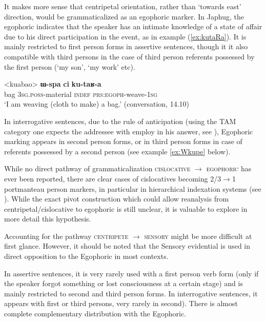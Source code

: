 \documentclass[oldfontcommands,oneside,a4paper,11pt]{article}
\newcommand{\ipa}[1]{\mbox{\phon\textbf{#1}}} %
\begin{document}
It makes more sense that centripetal orientation, rather than `towards east' direction, would be grammaticalized as an egophoric marker. In Japhug, the egophoric indicates that the speaker has an  intimate knowledge of a state of affair due to his direct participation in the event, as in example (\ref{ex:kutaRa}). It is mainly restricted to first person forms in assertive sentences, though it it also compatible with third persons in the case of third person referents possessed by the first person (`my son', `my work' etc). 

\begin{exe}
\ex \label{ex:kutaRa}
\gll 
<kuabao> 	\ipa{ɯ-spa}  	\ipa{ci}  	\ipa{ku-taʁ-a}  \\
bag \textsc{3sg.poss}-material \textsc{indef} \textsc{prs:egoph}-weave-\textsc{1sg} \\
\glt `I am weaving (cloth to make) a bag.' (conversation, 14.10)
\end{exe}

In interrogative sentences, due to the rule of anticipation (using the TAM category one expects the addressee with employ in his answer, see \citealt{tournadre14evidentiality}), Egophoric marking appears in second person forms, or in third person forms in case of referents possessed by a second person (see example \ref{ex:Wkupe} below).

While no direct pathway of grammaticalization \textsc{cislocative} $\rightarrow$ \textsc{egophoric} has ever been reported, there are clear cases of cislocatives becoming 2/3$\rightarrow$1 portmanteau person markers, in particular in hierarchical indexation systems (see \citealt{jacques14inverse}). While the exact pivot construction which could allow reanalysis from centripetal/cislocative to egophoric is still unclear, it is valuable to explore in more detail this hypothesis.

Accounting for the pathway \textsc{centripete} $\rightarrow$ \textsc{sensory} might be more difficult at first glance. However, it should be noted that the Sensory evidential is used in direct opposition to the Egophoric in most contexts. 

In assertive sentences, it is very rarely used with a first person verb form (only if the speaker forgot something or lost consciousness at a certain stage) and is mainly restricted to second and third person forms. In interrogative sentences, it appears with first or third persons, very rarely in second). There is almost complete complementary distribution with the Egophoric. 
 
\end{document}
